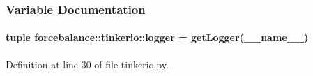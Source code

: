 \subsubsection{\-Variable \-Documentation}
\hypertarget{namespaceforcebalance_1_1tinkerio_a2213c6a64efe42ee845dad485eee582e}{
\paragraph[{logger}]{\setlength{\rightskip}{0pt plus 5cm}tuple {\bf forcebalance\-::tinkerio\-::logger} = get\-Logger(\-\_\-\-\_\-name\-\_\-\-\_\-)}}\label{namespaceforcebalance_1_1tinkerio_a2213c6a64efe42ee845dad485eee582e}


\-Definition at line 30 of file tinkerio.\-py.

